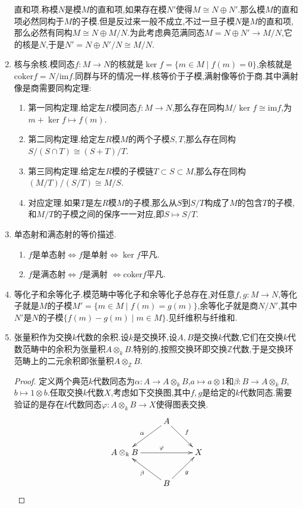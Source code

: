 \begin{enumerate}
	直和项.称模$N$是模$M$的直和项,如果存在模$N'$使得$M\cong N\oplus N'$.那么模$M$的直和项必然同构于$M$的子模.但是反过来一般不成立,不过一旦子模$N$是$M$的直和项,那么必然有同构$M\cong N\oplus M/N$.为此考虑典范满同态$M=N\oplus N'\to M/N$,它的核是$N$,于是$N'=N\oplus N'/N\cong M/N$.
	\item 核与余核.模同态$f:M\to N$的核就是$\ker f=\{m\in M\mid f(m)=0\}$,余核就是$\mathrm{coker}f=N/\mathrm{im}f$.同群与环的情况一样,核等价于子模,满射像等价于商.其中满射像是商需要同构定理:
	\begin{enumerate}
		\item 第一同构定理.给定左$R$模同态$f:M\to N$,那么存在同构$M/\ker f\cong\mathrm{im}f$,为$m+\ker f\mapsto f(m)$.
		\item 第二同构定理.给定左$R$模$M$的两个子模$S,T$,那么存在同构$S/(S\cap T)\cong(S+T)/T$.
		\item 第三同构定理.给定左$R$模的子模链$T\subset S\subset M$,那么存在同构$(M/T)/(S/T)\cong M/S$.
		\item 对应定理.如果$T$是左$R$模$M$的子模,那么从$S$到$S/T$构成了$M$的包含$T$的子模,和$M/T$的子模之间的保序一一对应,即$S\mapsto S/T$.
	\end{enumerate}
	\item 单态射和满态射的等价描述.
	\begin{enumerate}
		\item $f$是单态射$\Leftrightarrow$$f$是单射$\Leftrightarrow$$\ker f$平凡.
		\item $f$是满态射$\Leftrightarrow$$f$是满射 $\Leftrightarrow$$\mathrm{coker}f$平凡.
	\end{enumerate}
	\item 等化子和余等化子.模范畴中等化子和余等化子总存在,对任意$f,g:M\to N$,等化子就是$M$的子模$M'=\{m\in M\mid f(m)=g(m)\}$,余等化子就是商$N/N'$,其中$N'$是$N$的子模$\{f(m)-g(m)\mid m\in M\}$.见纤维积与纤维和.
	\item 张量积作为交换$k$代数的余积.设$k$是交换环,设$A,B$是交换$k$代数,它们在交换$k$代数范畴中的余积为张量积$A\otimes_kB$.特别的,按照交换环即交换$\mathbb{Z}$代数,于是交换环范畴上的二元余积即张量积$A\otimes_{\mathbb{Z}}B$.
	\begin{proof}
		
		定义两个典范$k$代数同态为$\alpha:A\to A\otimes_kB$,$a\mapsto a\otimes1$和$\beta:B\to A\otimes_kB$,$b\mapsto 1\otimes b$.任取交换$k$代数$X$,考虑如下交换图,其中$f,g$是给定的$k$代数同态.需要验证的是存在$k$代数同态$\varphi:A\otimes_kB\to X$使得图表交换.
		$$\xymatrix{&A\ar[dl]_{\alpha}\ar[dr]^{f}&\\A\otimes_kB\ar[rr]^{\varphi}&&X\\&B\ar[ul]^{\beta}\ar[ur]_g&}$$
		

\end{proof}
\end{enumerate}
